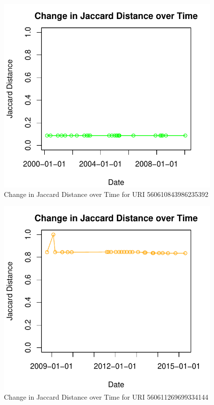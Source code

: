 \documentclass[a4paper,12pt]{article}
\begin{document}
\begin{figure}[H]
    \centering
    \includegraphics{stats/q3/560610843986235392.pdf}
    \caption{Change in Jaccard Distance over Time for URI 560610843986235392}
\end{figure}

\begin{figure}[H]
    \centering
    \includegraphics{stats/q3/560611269699334144.pdf}
    \caption{Change in Jaccard Distance over Time for URI 560611269699334144}
\end{figure}
\end{document}
